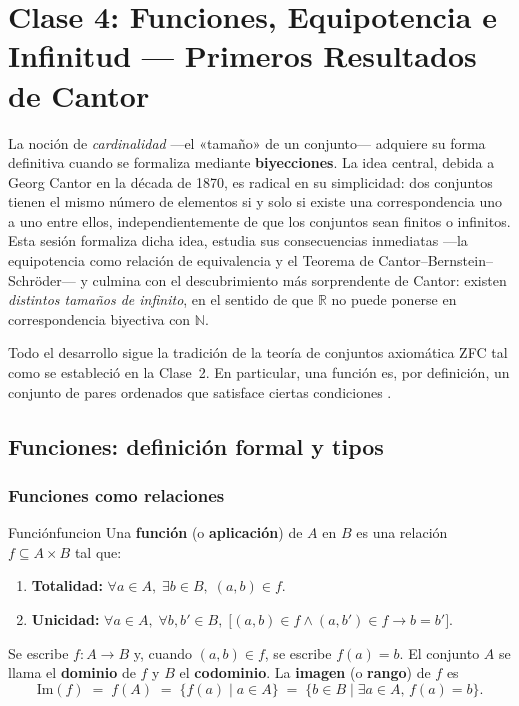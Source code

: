 \chapter{Clase 4: Funciones, Equipotencia e Infinitud — Primeros Resultados de Cantor}

La noción de \emph{cardinalidad} —el «tamaño» de un conjunto— adquiere su forma definitiva cuando se formaliza mediante \textbf{biyecciones}. La idea central, debida a Georg Cantor en la década de 1870, es radical en su simplicidad: dos conjuntos tienen el mismo número de elementos si y solo si existe una correspondencia uno a uno entre ellos, independientemente de que los conjuntos sean finitos o infinitos. Esta sesión formaliza dicha idea, estudia sus consecuencias inmediatas —la equipotencia como relación de equivalencia y el Teorema de Cantor–Bernstein–Schröder— y culmina con el descubrimiento más sorprendente de Cantor: existen \emph{distintos tamaños de infinito}, en el sentido de que $\mathbb{R}$ no puede ponerse en correspondencia biyectiva con $\mathbb{N}$.

Todo el desarrollo sigue la tradición de la teoría de conjuntos axiomática ZFC tal como se estableció en la Clase~2. En particular, una función es, por definición, un conjunto de pares ordenados que satisface ciertas condiciones \cite{enderton1977, jech2003, kunen2011}.

\section{Funciones: definición formal y tipos}

\subsection{Funciones como relaciones}

\begin{definicion}{Función}{funcion}
Una \textbf{función} (o \textbf{aplicación}) de $A$ en $B$ es una relación $f \subseteq A \times B$ tal que:
\begin{enumerate}[leftmargin=2em, label=(\roman*)]
  \item \textbf{Totalidad:} $\forall a \in A,\; \exists b \in B,\; (a,b) \in f$.
  \item \textbf{Unicidad:} $\forall a \in A,\; \forall b, b' \in B,\; \bigl[(a,b) \in f \wedge (a,b') \in f \to b = b'\bigr]$.
\end{enumerate}
Se escribe $f: A \to B$ y, cuando $(a,b) \in f$, se escribe $f(a) = b$. El conjunto $A$ se llama el \textbf{dominio} de $f$ y $B$ el \textbf{codominio}. La \textbf{imagen} (o \textbf{rango}) de $f$ es
\[
  \mathrm{Im}(f) \;=\; f(A) \;=\; \{f(a) \mid a \in A\} \;=\; \{b \in B \mid \exists a \in A,\, f(a) = b\}.
\]
\end{definicion}


